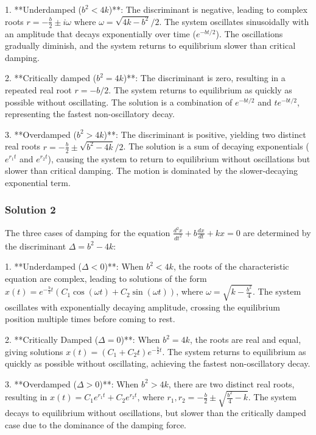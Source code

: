 \documentclass{article}
\begin{document}
1. **Underdamped (\( b^2 < 4k \))**:  
   The discriminant is negative, leading to complex roots \( r = -\frac{b}{2} \pm i\omega \) where \( \omega = \sqrt{4k - b^2}/2 \). The system oscillates sinusoidally with an amplitude that decays exponentially over time (\( e^{-bt/2} \)). The oscillations gradually diminish, and the system returns to equilibrium slower than critical damping.  

2. **Critically damped (\( b^2 = 4k \))**:  
   The discriminant is zero, resulting in a repeated real root \( r = -b/2 \). The system returns to equilibrium as quickly as possible without oscillating. The solution is a combination of \( e^{-bt/2} \) and \( t e^{-bt/2} \), representing the fastest non-oscillatory decay.  

3. **Overdamped (\( b^2 > 4k \))**:  
   The discriminant is positive, yielding two distinct real roots \( r = -\frac{b}{2} \pm \sqrt{b^2 - 4k}/2 \). The solution is a sum of decaying exponentials (\( e^{r_1 t} \) and \( e^{r_2 t} \)), causing the system to return to equilibrium without oscillations but slower than critical damping. The motion is dominated by the slower-decaying exponential term.

\subsubsection{Solution 2}
The three cases of damping for the equation \( \frac{d^2x}{dt^2} + b\frac{dx}{dt} + kx = 0 \) are determined by the discriminant \( \Delta = b^2 - 4k \):

1. **Underdamped (\( \Delta < 0 \))**: When \( b^2 < 4k \), the roots of the characteristic equation are complex, leading to solutions of the form \( x(t) = e^{-\frac{b}{2}t}\left(C_1 \cos(\omega t) + C_2 \sin(\omega t)\right) \), where \( \omega = \sqrt{k - \frac{b^2}{4}} \). The system oscillates with exponentially decaying amplitude, crossing the equilibrium position multiple times before coming to rest.

2. **Critically Damped (\( \Delta = 0 \))**: When \( b^2 = 4k \), the roots are real and equal, giving solutions \( x(t) = (C_1 + C_2 t)e^{-\frac{b}{2}t} \). The system returns to equilibrium as quickly as possible without oscillating, achieving the fastest non-oscillatory decay.

3. **Overdamped (\( \Delta > 0 \))**: When \( b^2 > 4k \), there are two distinct real roots, resulting in \( x(t) = C_1 e^{r_1 t} + C_2 e^{r_2 t} \), where \( r_1, r_2 = -\frac{b}{2} \pm \sqrt{\frac{b^2}{4} - k} \). The system decays to equilibrium without oscillations, but slower than the critically damped case due to the dominance of the damping force.
\end{document}
